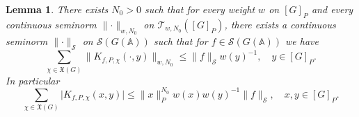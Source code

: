 \documentclass[letterpaper,11pt]{amsart}
\newcommand{\fa}{\mathfrak{a}}
\newcommand{\fX}{\mathfrak{X}}
\newcommand{\bA}{\mathbb{A}}
\newcommand{\cA}{\mathcal{A}}
\newcommand{\cB}{\mathcal{B}}
\newcommand{\cS}{\mathcal{S}}
\newcommand{\cT}{\mathcal{T}}
\newcommand{\rd}{\mathrm{d}}
\newcommand{\<}{\negthickspace}
\providecommand{\abs}[1]{\lvert#1\rvert}
\providecommand{\aabs}[1]{\lVert#1\rVert}
\theoremstyle{definition}
\theoremstyle{plain}
\newtheorem{lemma}[definition]{Lemma}
\theoremstyle{remark}
\numberwithin{equation}{section}
\begin{document}
\begin{lemma}   \label{lemma:estimate_kernel}
There exists $N_0>0$ such that for every weight $w$ on $[G]_P$ and every
continuous seminorm $\aabs{\cdot}_{w, N_0}$ on $\cT_{w, N_0}([G]_P)$, there
exists a continuous seminorm $\aabs{\cdot}_{\cS}$ on $\cS(G(\bA))$ such that for $f \in \cS(G(\bA))$ we have
    \[
    \sum_{\chi \in \fX(G)} \aabs{K_{f, P, \chi}(\cdot, y)}_{w, N_0} \leq
    \aabs{f}_{\cS} w(y)^{-1}, \quad y \in [G]_P.
    \]
In particular
    \[
    \sum_{\chi \in \fX(G)}
    \abs{K_{f, P, \chi}(x, y)} \leq
    \aabs{x}_P^{N_0} w(x) w(y)^{-1} \aabs{f}_{\cS}, \quad
    x, y \in [G]_P.
    \]
\end{lemma}

\end{document}
